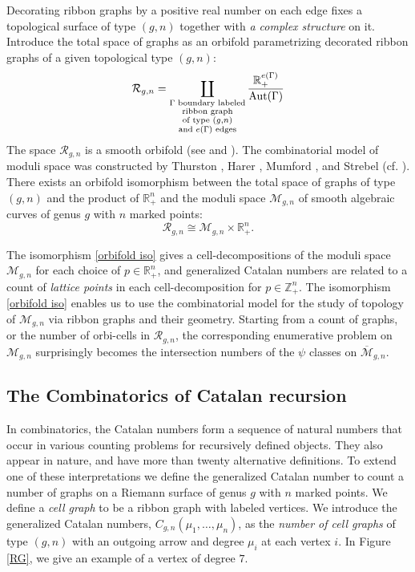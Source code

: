 \documentclass[oneside, 11pt]{amsart}
\theoremstyle{definition}
\numberwithin{equation}{subsection}
\def\Aut{{\text{\rm{Aut}}}}
\newcommand{\be}{\begin{equation}}
\newcommand{\ee}{\end{equation}}
\newcommand{\Mbar}{{\overline{\mathcal{M}}}}
\newcommand{\bR}{{\mathbb{R}}}
\newcommand{\bZ}{{\mathbb{Z}}}
\newcommand{\cM}{{\mathcal{M}}}
\begin{document}
Decorating ribbon graphs by a positive real number on each edge fixes a topological surface of type $(g,n)$ together with \textit{a complex structure} on it. Introduce the total space of graphs as an orbifold parametrizing decorated ribbon graphs of a given
topological type $(g,n)$:
$$\mathcal{R}_{g,n} = \coprod_{\substack{\Gamma {\text{ boundary labeled}} \\ {\text{ribbon graph}}\\
{\text{of type }} (g,n) \\ {\text{and $e(\Gamma)$ edges}}}}
\frac{\bR_+ ^{e(\Gamma)}}{\Aut (\Gamma)}$$
\noindent
The space $\mathcal{R}_{g,n}$ is a smooth orbifold (see \cite[Section~3]{MP1998} and \cite{STT}). The combinatorial model of moduli space was constructed by  Thurston \cite{STT}, Harer \cite{Harer, HZ}, Mumford \cite{Mumford}, and Strebel \cite{Strebel} (cf. \cite{MP1998}). There exists an orbifold isomorphism between the total space of graphs  of type $(g,n)$ and the product of $ \bR_+^n$ and the moduli space $\cM_{g,n}$ of smooth algebraic curves of genus $g$ with $n$ marked points:
\be \label{orbifold iso}
\mathcal{R}_{g,n}\cong \cM_{g,n}\times \bR_+^n.
\ee

The isomorphism 
\eqref{orbifold iso} gives a 
cell-decompositions of the 
moduli space  $\cM_{g,n}$ for each
choice of $p\in \bR_+^n$,
and generalized Catalan numbers are related to a count of \textit{lattice points} in each cell-decomposition
for $p\in \bZ_+^n$. The isomorphism \eqref{orbifold iso} enables us to use the combinatorial model for the study of  topology of
$\cM_{g,n}$  via ribbon graphs and their geometry. Starting from a count of graphs,  or the 
number of orbi-cells in  $\mathcal{R}_{g,n}$, the corresponding enumerative problem on
$\cM_{g,n}$ surprisingly becomes the intersection 
numbers of the $\psi$ classes on $\Mbar_{g,n}$. 


\subsection{The Combinatorics of Catalan recursion}\label{recursion}

In combinatorics, the Catalan numbers form a sequence of natural numbers that occur in various counting problems for recursively defined objects. They also appear in nature, and have more than twenty alternative definitions. To extend one of these interpretations we define the generalized Catalan number to count a number of graphs on a Riemann surface of genus $g$ with $n$ marked points. We define a \textit{cell graph} to be a ribbon graph with labeled vertices. We introduce the generalized Catalan numbers, $C_{g,n}(\mu_1,\ldots, \mu_n)$, as the \textit{number of cell graphs} of type $(g,n)$ with an outgoing arrow and degree $\mu_i$ at each vertex $i$. In Figure \eqref{RG}, we give an example of a vertex of degree $7$.
 
\end{document}
